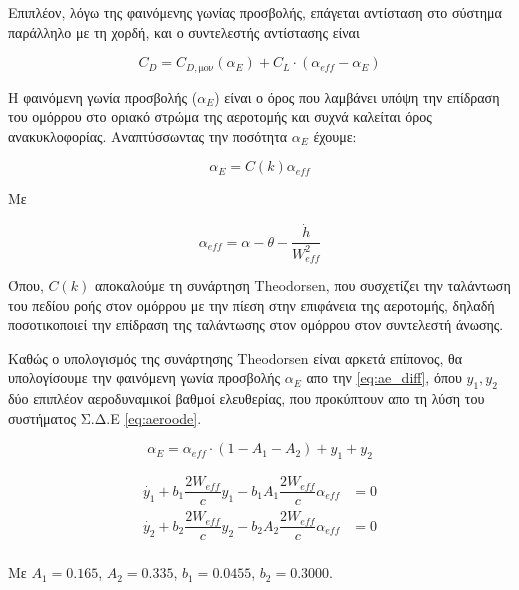 Επιπλέον, λόγω της φαινόμενης γωνίας προσβολής, επάγεται αντίσταση στο σύστημα παράλληλο με τη χορδή, και ο συντελεστής αντίστασης είναι

\begin{equation}
    C_D = C_{D,\text{μον}}(\alpha_{E}) + C_L\cdot (\alpha_{eff}-\alpha_E)
\end{equation}

\noindent Η φαινόμενη γωνία προσβολής ($\alpha_E$) είναι ο όρος που λαμβάνει υπόψη την επίδραση του ομόρρου στο οριακό στρώμα της αεροτομής και συχνά καλείται όρος ανακυκλοφορίας. Αναπτύσσωντας την ποσότητα $\alpha_E$ έχουμε:

\begin{equation}
    \alpha_E = C(k)\alpha_{eff}
    \label{eq:ae}
\end{equation}

\noindent
Με

\begin{equation}
\alpha_{eff} = \alpha - \theta -\dfrac{\dot{h}}{W_{eff}^2}
    \label{eq:aeff_uns}
\end{equation}


\noindent
Όπου, $C(k)$ αποκαλούμε τη συνάρτηση Theodorsen, που συσχετίζει την ταλάντωση του πεδίου ροής στον ομόρρου με την πίεση στην επιφάνεια της αεροτομής, δηλαδή ποσοτικοποιεί την επίδραση της ταλάντωσης στον ομόρρου στον συντελεστή άνωσης. 

Καθώς ο υπολογισμός της συνάρτησης Theodorsen είναι αρκετά επίπονος, θα υπολογίσουμε την φαινόμενη γωνία προσβολής $\alpha_E$ απο την \cref{eq:ae_diff}, όπου $y_1, y_2$ δύο επιπλέον αεροδυναμικοί βαθμοί ελευθερίας, που προκύπτουν απο τη λύση του συστήματος Σ.Δ.Ε \ref{eq:aeroode}.

\begin{equation}
    \alpha_{E} = \alpha_{eff}\cdot (1-A_1-A_2)+y_1+y_2
    \label{eq:ae_diff}
\end{equation}

\begin{equation}
    \begin{aligned}
        \dot{y_1} + b_1\dfrac{2W_{eff}}{c}y_1-b_1A_1\dfrac{2W_{eff}}{c}\alpha_{eff} &=0\\
        \dot{y_2} + b_2\dfrac{2W_{eff}}{c}y_2-b_2A_2\dfrac{2W_{eff}}{c}\alpha_{eff} &=0\\
    \end{aligned}
    \label{eq:aeroode}
\end{equation}

\noindent Με $A_1=0.165$, $A_2=0.335$, $b_1=0.0455$, $b_2=0.3000$.

